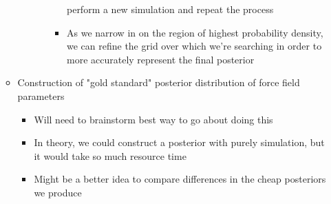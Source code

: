 \documentclass[aps,pre,nofootinbib,superscriptaddress,linenumbers,10pt, draft,tightenlines]{revtex4-1}
\begin{document}
\begin{itemize}
\begin{itemize}
\begin{itemize}
\begin{itemize}
\begin{itemize}
            		      perform a new simulation and repeat the process
            		\item As we narrow in on the region of highest probability density, we can refine the grid over which we're searching in order to more
            		      accurately represent the final posterior
            	\end{itemize}
            \end{itemize}
        \end{itemize}
        \item Construction of "gold standard" posterior distribution of force field parameters
        \begin{itemize}
        	\item Will need to brainstorm best way to go about doing this
        	\item In theory, we could construct a posterior with purely simulation, but it would take so much resource time
        	\item Might be a better idea to compare differences in the cheap posteriors we produce 
        \end{itemize}              
    \end{itemize}
\end{itemize}
\end{document}
